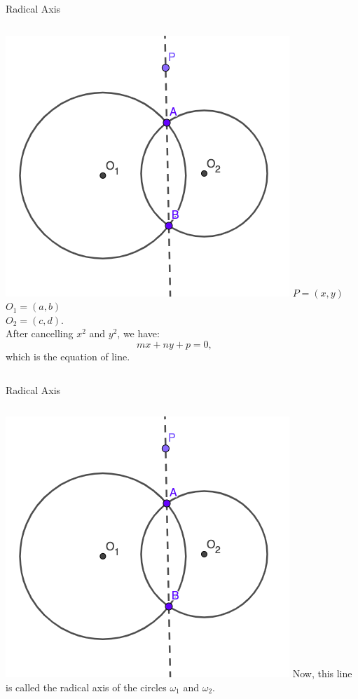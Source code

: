 \documentclass{beamer}
\begin{document}
\begin{frame}{Radical Axis}
	\begin{columns}
		\includegraphics[scale=0.4]{rad1.png}
		$P = (x,y)$ \\
		$O_1 = (a, b)$\\
		$O_2 = (c, d)$.\\
		\phantom{Spacing}
		After cancelling $x^2$ and $y^2$, we have:
		\[
			mx + ny +p = 0
		,\] which is the equation of line.
	\end{columns}
\end{frame}
\begin{frame}{Radical Axis}
	\begin{columns}
		\column{0.6\textwidth}
		\includegraphics[scale=0.4]{rad1.png}
		\column{0.4\textwidth}
		Now, this line is called the radical axis of the circles
		$\omega_1$ and $\omega_2$.
	\end{columns}
\end{frame}
\end{document}
